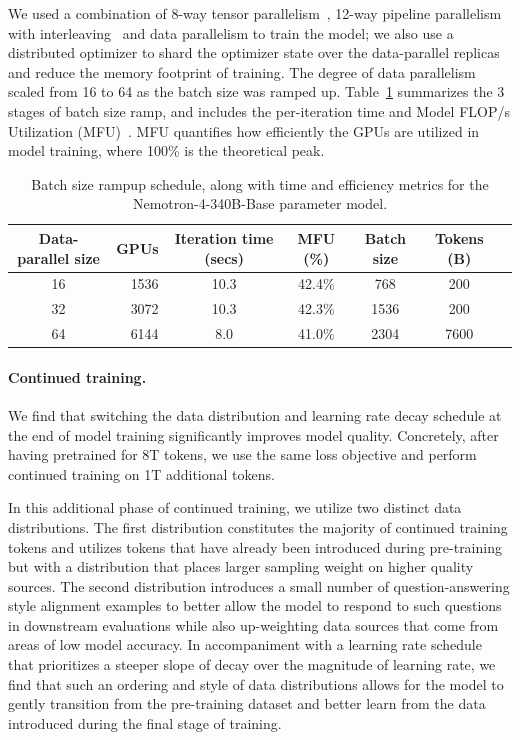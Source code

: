 \documentclass[11pt]{article}
\newcommand{\ours}{Nemotron-4-340B-Base}
\begin{document}
We used a combination of 8-way tensor parallelism~\citep{shoeybi2019megatron}, 12-way pipeline parallelism with interleaving~\citep{narayanan2021efficient} and data parallelism to train the model; we also use a distributed optimizer to shard the optimizer state over the data-parallel replicas and reduce the memory footprint of training. The degree of data parallelism scaled from 16 to 64 as the batch size was ramped up. 
Table~\ref{tab:43bmodel_batch_time_mfu} summarizes the 3 stages of batch size ramp, and includes the per-iteration time and Model FLOP/s Utilization (MFU)~\citep{chowdhery2022palm,korthikanti2022sequence}. MFU quantifies how efficiently the GPUs are utilized in model training, where 100\% is the theoretical peak.

\begin{table}[H]
    \centering
    \begin{tabular}{crccccc}
    \toprule
    Data-parallel size & GPUs & Iteration time (secs) & MFU (\%) & Batch size & Tokens (B) \\
    \toprule
    16 & 1536 & 10.3 & 42.4\% & 768 & 200  \\
    32 & 3072 & 10.3 & 42.3\% & 1536 & 200  \\
    64 & 6144 & 8.0 & 41.0\% & 2304 & 7600 \\
    \bottomrule
    \end{tabular}
    \caption{Batch size rampup schedule, along with time and efficiency metrics for the \ours{} parameter model.}
    \label{tab:43bmodel_batch_time_mfu}
\end{table}



\paragraph{Continued training.}
We find that switching the data distribution and learning rate decay schedule at the end of model training significantly improves model quality. Concretely, after having pretrained for 8T tokens, we use the same loss objective and perform continued training on 1T additional tokens.

In this additional phase of continued training, we utilize two distinct data distributions. 
The first distribution constitutes the majority of continued training tokens and utilizes tokens that have already been introduced during pre-training but with a distribution that places larger sampling weight on higher quality sources. 
The second distribution introduces a small number of question-answering style alignment examples to better allow the model to respond to such questions in downstream evaluations while also up-weighting data sources that come from areas of low model accuracy. 
In accompaniment with a learning rate schedule that prioritizes a steeper slope of decay over the magnitude of learning rate, we find that such an ordering and style of data distributions allows for the model to gently transition from the pre-training dataset and better learn from the data introduced during the final stage of training. 
\end{document}
